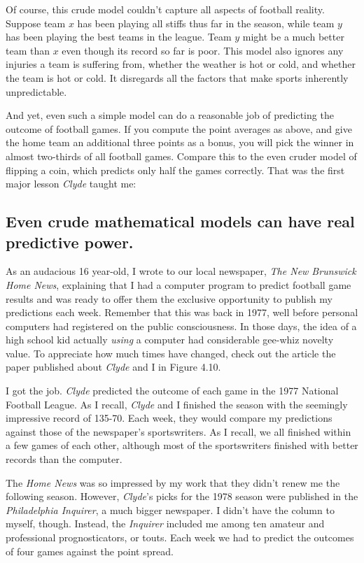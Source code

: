 \documentclass[10pt]{article}
\begin{document}
Of course, this crude model couldn't capture all aspects of football reality. Suppose team $x$ has been playing all stiffs thus far in the season, while team $y$ has been playing the best teams in the league. Team $y$ might be a much better team than $x$ even though its record so far is poor. This model also ignores any injuries a team is suffering from, whether the weather is hot or cold, and whether the team is hot or cold. It disregards all the factors that make sports inherently unpredictable.

And yet, even such a simple model can do a reasonable job of predicting the outcome of football games. If you compute the point averages as above, and give the home team an additional three points as a bonus, you will pick the winner in almost two-thirds of all football games. Compare this to the even cruder model of flipping a coin, which predicts only half the games correctly. That was the first major lesson \emph{Clyde} taught me:

\subsection*{Even crude mathematical models can have real predictive power.}

As an audacious 16 year-old, I wrote to our local newspaper, \emph{The New Brunswick Home News}, explaining that I had a computer program to predict football game results and was ready to offer them the exclusive opportunity to publish my predictions each week. Remember that this was back in 1977, well before personal computers had registered on the public consciousness. In those days, the idea of a high school kid actually \emph{using} a computer had considerable gee-whiz novelty value. To appreciate how much times have changed, check out the article the paper published about \emph{Clyde} and I in Figure 4.10.

I got the job. \emph{Clyde} predicted the outcome of each game in the 1977 National Football League. As I recall, \emph{Clyde} and I finished the season with the seemingly impressive record of 135-70. Each week, they would compare my predictions against those of the newspaper's sportswriters. As I recall, we all finished within a few games of each other, although most of the sportswriters finished with better records than the computer.

The \emph{Home News} was so impressed by my work that they didn't renew me the following season. However, \emph{Clyde}'s picks for the 1978 season were published in the \emph{Philadelphia Inquirer}, a much bigger newspaper. I didn't have the column to myself, though. Instead, the \emph{Inquirer} included me among ten amateur and professional prognosticators, or touts. Each week we had to predict the outcomes of four games against the point spread.
\end{document}
